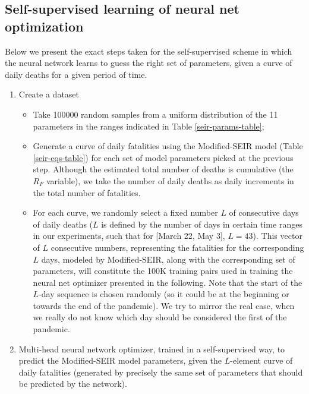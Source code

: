\documentclass[11pt]{article}
\begin{document}
\subsection{Self-supervised learning of neural net optimization}

Below we present the exact steps taken for the self-supervised scheme in which the neural network learns to guess the right set of parameters, given a curve of daily deaths for a given period of time.

\begin{enumerate}
    \item Create a dataset
    \begin{itemize}
        \item Take 100000 random samples from a uniform distribution of the 11 parameters in the ranges indicated in Table \ref{seir-params-table};

        \item Generate a curve of daily fatalities using the Modified-SEIR model (Table \ref{seir-eqs-table}) for each set of model parameters picked at the previous step. Although the estimated total number of deaths is cumulative (the $R_F$ variable), we take the number of daily deaths as daily increments in the total number of fatalities.
        
        \item For each curve, we randomly select a fixed number $L$ of consecutive days of daily deaths ($L$ is defined by the number of days in certain time ranges in our experiments, such that for [March 22, May 3], $L = 43$). This vector of $L$ consecutive numbers, representing the fatalities for the corresponding $L$ days, modeled by Modified-SEIR, along with the corresponding set of parameters, will constitute the 100K training pairs used in training the neural net optimizer presented in the following. Note that the start of the $L$-day sequence is chosen randomly (so it could be at the beginning or towards the end of the pandemic). We try to mirror the real case, when we really do not know which day should be considered the first of the pandemic.
    \end{itemize}
    
    \item Multi-head neural network optimizer, trained in a self-supervised way, to predict the Modified-SEIR model parameters, given the $L$-element curve of daily fatalities (generated by precisely the same set of parameters that should be predicted by the network).


\end{enumerate}
\end{document}
